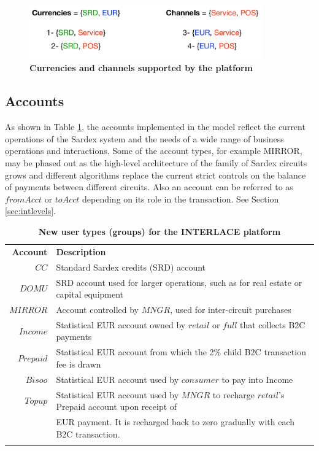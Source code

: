 \vspace{-0.3cm}
\begin{figure}[h]
\centering
\includegraphics[width=10cm]{Figures/Curr_Chan}
\caption{\small\textbf{Currencies and channels supported by the platform}}
\label{fig:currchan}
\vspace{-0.5cm}
\end{figure}

\subsection{Accounts}
As shown in Table \ref{tab:accounts}, the accounts implemented in the model reflect the current operations of the Sardex system and the needs of a wide range of business operations and interactions. Some of the account types, for example MIRROR, may be phased out as the high-level architecture of the family of Sardex circuits grows and different algorithms replace the current strict controls on the balance of payments between different circuits. Also an account can be referred to as $fromAcct$ or $toAcct$ depending on its role in the transaction. See Section \ref{sec:intlevels}.

\setlength{\tabcolsep}{10pt}
\begin{table}[htbp]
\begin{centering}
\small
{
\begin{tabular}{ r | l  }
\hline
\textbf{Account}	& \textbf{Description} \\
\Xhline{1.5pt}
$CC$ & Standard Sardex credits (SRD) account \\
\hline
$DOMU$ & SRD account used for larger operations, such as for real estate or capital equipment\\
\hline
$MIRROR$ & Account controlled by $MNGR$, used for inter-circuit purchases \\
\hline
$Income$ & Statistical EUR account owned by $retail$ or $full$ that collects B2C payments\\
\hline
$Prepaid$ & Statistical EUR account from which the 2\% child B2C transaction fee is drawn \\
\hline
$Bisoo$ & Statistical EUR account used by $consumer$ to pay into Income \\
\hline
$Topup$ & Statistical EUR account used by $MNGR$ to recharge $retail$'s Prepaid account upon receipt of \\
&\hspace{0.5cm} EUR payment. It is recharged back to zero gradually with each B2C transaction. \\
\Xhline{1.5pt}
\end{tabular}
}
\caption{\small\textbf{New user types (groups) for the INTERLACE platform}}
\label{tab:accounts}
\vspace{-0.5cm}
\end{centering}
\end{table}

